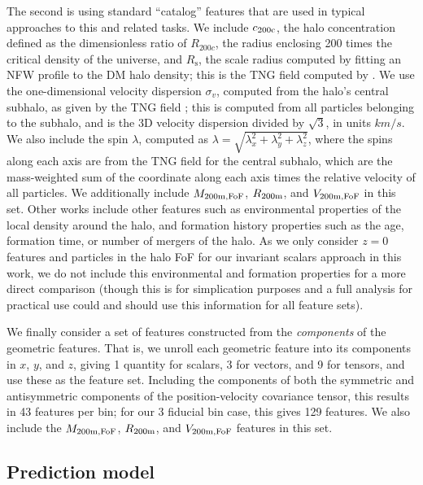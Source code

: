 The second is using standard ``catalog'' features that are used in typical approaches to this and related tasks.
We include $c_\mathrm{200c}$, the halo concentration defined as the dimensionless ratio of $R_{200c}$, the radius enclosing 200 times the critical density of the universe, and $R_\mathrm{s}$, the scale radius computed by fitting an NFW profile to the DM halo density; this is the TNG field  computed by \cite{anbajagane_baryonic_2021}.
We use the one-dimensional velocity dispersion $\sigma_{v}$, computed from the halo's central \dark subhalo, as given by the TNG field ; this is computed from all particles belonging to the subhalo, and is the 3D velocity dispersion divided by $\sqrt{3}$, in units $km/s$.
We also include the spin $\lambda$, computed as $\lambda = \sqrt{\lambda_x^2 + \lambda_y^2 + \lambda_z^2}$, where the spins along each axis are from the TNG field  for the central \dark subhalo, which are the mass-weighted sum of the coordinate along each axis times the relative velocity of all particles.
We additionally include $M_\mathrm{200m,FoF}$, $R_\mathrm{200m}$, and $V_\mathrm{200m,FoF}$ in this set.
Other works include other features such as environmental properties of the local density around the halo, and formation history properties such as the age, formation time, or number of mergers of the halo.
As we only consider $z=0$ features and particles in the halo FoF for our invariant scalars approach in this work, we do not include this environmental and formation properties for a more direct comparison (though this is for simplication purposes and a full analysis for practical use could and should use this information for all feature sets).

We finally consider a set of features constructed from the \emph{components} of the geometric features.
That is, we unroll each geometric feature into its components in $x$, $y$, and $z$, giving 1 quantity for scalars, 3 for vectors, and 9 for tensors, and use these as the feature set. 
Including the components of both the symmetric and antisymmetric components of the position-velocity covariance tensor, this results in 43 features per bin; for our 3 fiducial bin case, this gives 129 features.
We also include the $M_\mathrm{200m,FoF}$, $R_\mathrm{200m}$, and $V_\mathrm{200m,FoF}$ features in this set.


\subsection{Prediction model}
\label{sec:prediction_model}

